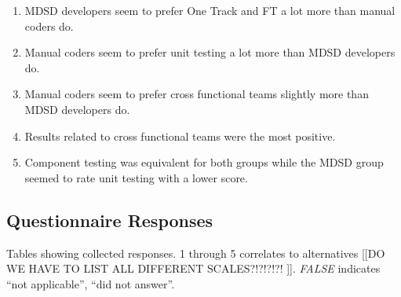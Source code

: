 \documentclass[final_report_innit.tex]{subfiles}
\begin{document}
\begin{enumerate}
	\begin{enumerate}
		\item MDSD developers seem to prefer One Track and FT a lot more than manual coders do. 
		\item Manual coders seem to prefer unit testing a lot more than MDSD developers do.
		\item Manual coders seem to prefer cross functional teams slightly more than MDSD developers do.
		\item Results related to cross functional teams were the most positive. 
		\item Component testing was equivalent for both groups while the MDSD group seemed to rate unit testing with a lower score.
	\end{enumerate}
\end{enumerate}

\subsection{Questionnaire Responses}
Tables showing collected responses. 1 through 5 correlates to alternatives [[DO WE HAVE TO LIST ALL DIFFERENT SCALES?!?!?!?! ]]. \textit{FALSE} indicates ``not applicable'', ``did not answer''.
\end{document}
